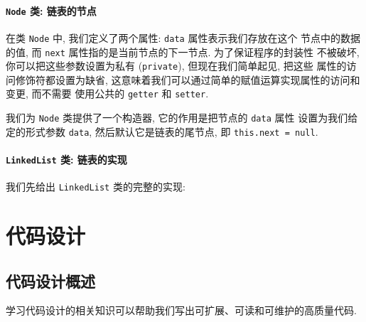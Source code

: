 \documentclass[10pt,UTF8]{book} %
\begin{document}
\subsection{\lstinline|Node| 类: 链表的节点}

% 

在类 \lstinline|Node| 中, 我们定义了两个属性: \lstinline|data| 属性表示我们存放在这个
节点中的数据的值, 而 \lstinline|next| 属性指的是当前节点的下一节点. 为了保证程序的封装性
不被破坏, 你可以把这些参数设置为私有 (\lstinline|private|), 但现在我们简单起见, 把这些
属性的访问修饰符都设置为缺省, 这意味着我们可以通过简单的赋值运算实现属性的访问和变更, 而不需要
使用公共的 \lstinline|getter| 和 \lstinline|setter|.

我们为 \lstinline|Node| 类提供了一个构造器, 它的作用是把节点的 \lstinline|data| 属性
设置为我们给定的形式参数 \lstinline|data|, 然后默认它是链表的尾节点, 即 \lstinline|this.next = null|.

\subsection{\lstinline|LinkedList| 类: 链表的实现}

我们先给出 \lstinline|LinkedList| 类的完整的实现:
% 

\part{代码设计}

\chapter{代码设计概述}

学习代码设计的相关知识可以帮助我们写出可扩展、可读和可维护的高质量代码.
\end{document}
